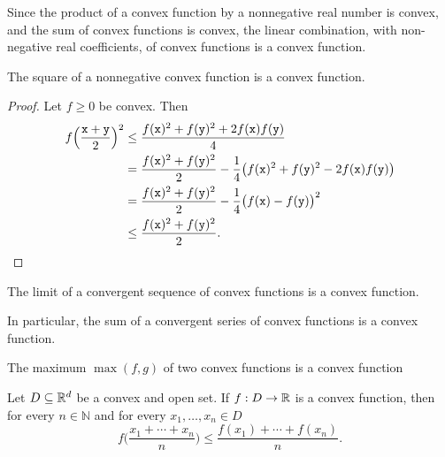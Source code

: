 \begin{rem}
    Since the product of a convex function by a nonnegative real number is convex, and the sum of convex functions is convex, the linear combination, with non-negative real coefficients, of convex functions is a convex function.
\end{rem}

\begin{thm}
    The square of a nonnegative convex function is a convex function.
\end{thm}

\begin{proof}
    Let $f\ge0$ be convex. Then
    \begin{align*}
        f\Big(\frac{\mathtt x+\mathtt y}2\Big)^2
            &\le \frac{f(\mathtt x)^2+f(\mathtt y)^2
                +2f(\mathtt x)f(\mathtt y)}4\\
            &= \frac{f(\mathtt x)^2+f(\mathtt y)^2}2
                - \frac14\big(f(\mathtt x)^2+f(\mathtt y)^2-2f(\mathtt x)f(\mathtt y)\big)\\
            &= \frac{f(\mathtt x)^2+f(\mathtt y)^2}2
                - \frac14\big(f(\mathtt x)-f(\mathtt y)\big)^2\\
            &\le \frac{f(\mathtt x)^2+f(\mathtt y)^2}2.
    \end{align*}
\end{proof}

\begin{rem}
    The limit of a convergent sequence of convex functions is a convex function.
    
    In particular, the sum of a convergent series of convex functions is a convex function.

    The maximum $\max(f,g)$ of two convex functions is a convex function
\end{rem}

\begin{thm}
    Let\/ $D \subseteq \mathbb{R}^d$ be a convex and open set. If\/ $f : D \to \mathbb{R}$ is a convex function, then for every\/ $n \in \mathbb{N}$ and for every\/ $x_1,\dots,x_n \in D$
    \[
        f\Big(\frac{x_1 + \cdots + x_n}{n}\Big)
            \le \frac{f(x_1) + \cdots + f(x_n)}{n}.
    \]
\end{thm}

